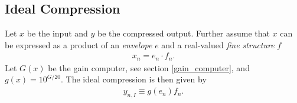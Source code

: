 \documentclass[../main2.tex]{subfiles}
\begin{document}
\subsection{Ideal Compression} \label{ideal_compression}
Let $x$ be the input and $y$ be the compressed output. Further assume that $x$ can be expressed as a product of an \emph{envelope} $e$ and a real-valued \emph{fine structure} $f$ 
\begin{align}
x_n = e_n\cdot f_n.
\end{align}
Let $G(x)$ be the gain computer, see section \ref{gain_computer}, and $g(x) = 10^{G/20}$. The ideal compression is then given by
\begin{align}
y_{n,I} \equiv g(e_n) f_n. 
\end{align}
\end{document}

